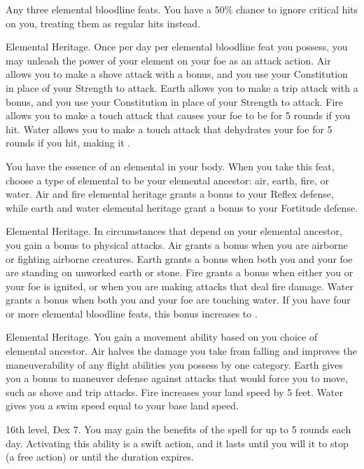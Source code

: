 
\featpre Any three elemental bloodline feats.
\featben You have a 50\% chance to ignore critical hits on you, treating them as regular hits instead.

\featpre Elemental Heritage.
\featben Once per day per elemental bloodline feat you possess, you may unleash the power of your element on your foe as an attack action.
Air allows you to make a shove attack with a  bonus, and you use your Constitution in place of your Strength to attack.
Earth allows you to make a trip attack with a  bonus, and you use your Constitution in place of your Strength to attack.
Fire allows you to make a touch attack that causes your foe to be \ignited for 5 rounds if you hit.
Water allows you to make a touch attack that dehydrates your foe for 5 rounds if you hit, making it \fatigued.

\featben You have the essence of an elemental in your body.
When you take this feat, choose a type of elemental to be your elemental ancestor: air, earth, fire, or water.
Air and fire elemental heritage grants a  bonus to your Reflex defense, while earth and water elemental heritage grant a  bonus to your Fortitude defense.

\featpre Elemental Heritage.
\featben In circumstances that depend on your elemental ancestor, you gain a  bonus to physical attacks.
Air grants a bonus when you are airborne or fighting airborne creatures.
Earth grants a bonus when both you and your foe are standing on unworked earth or stone.
Fire grants a bonus when either you or your foe is ignited, or when you are making attacks that deal fire damage.
Water grants a bonus when both you and your foe are touching water.
If you have four or more elemental bloodline feats, this bonus increases to .

\featpre Elemental Heritage.
\featben You gain a movement ability based on you choice of elemental ancestor.
Air halves the damage you take from falling and improves the maneuverability of any flight abilities you possess by one category.
Earth gives you a  bonus to maneuver defense against attacks that would force you to move, such as shove and trip attacks.
Fire increases your land speed by 5 feet.
Water gives you a swim speed equal to your base land speed.

\featpres 16th level, Dex 7.
\featben You may gain the benefits of the 
spell for up to 5 rounds each day.
Activating this ability is a swift action, and it lasts until you will it to stop (a free action) or until the duration expires.

